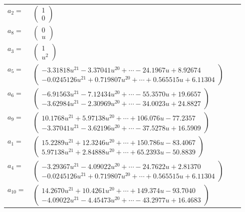 \documentclass[1p]{elsarticle_modified}
\theoremstyle{definition}
\begin{document}
\begin{tabular}{m{7pt} m{180pt} m{7pt} m{180pt} }
\flushright $a_{2}=$&$\begin{pmatrix}1\\0\end{pmatrix}$ \\
\flushright $a_{8}=$&$\begin{pmatrix}0\\u\end{pmatrix}$ \\
\flushright $a_{3}=$&$\begin{pmatrix}1\\u^2\end{pmatrix}$ \\
\flushright $a_{5}=$&$\begin{pmatrix}-3.31818 u^{21}-3.37041 u^{20}+\cdots-24.1967 u+8.92674\\-0.0245126 u^{21}+0.719807 u^{20}+\cdots+0.565515 u+6.11304\end{pmatrix}$ \\
\flushright $a_{6}=$&$\begin{pmatrix}-6.91563 u^{21}-7.12434 u^{20}+\cdots-55.3570 u+19.6657\\-3.62984 u^{21}-2.30969 u^{20}+\cdots-34.0023 u+24.8827\end{pmatrix}$ \\
\flushright $a_{9}=$&$\begin{pmatrix}10.1768 u^{21}+5.97138 u^{20}+\cdots+106.076 u-77.2357\\-3.37041 u^{21}-3.62196 u^{20}+\cdots-37.5278 u+16.5909\end{pmatrix}$ \\
\flushright $a_{1}=$&$\begin{pmatrix}15.2289 u^{21}+12.3246 u^{20}+\cdots+150.786 u-83.4067\\5.97138 u^{21}+2.84888 u^{20}+\cdots+65.2393 u-50.8839\end{pmatrix}$ \\
\flushright $a_{4}=$&$\begin{pmatrix}-3.29367 u^{21}-4.09022 u^{20}+\cdots-24.7622 u+2.81370\\-0.0245126 u^{21}+0.719807 u^{20}+\cdots+0.565515 u+6.11304\end{pmatrix}$ \\
\flushright $a_{10}=$&$\begin{pmatrix}14.2670 u^{21}+10.4261 u^{20}+\cdots+149.374 u-93.7040\\-4.09022 u^{21}-4.45473 u^{20}+\cdots-43.2977 u+16.4683\end{pmatrix}$ \\

\end{tabular}
\end{document}
